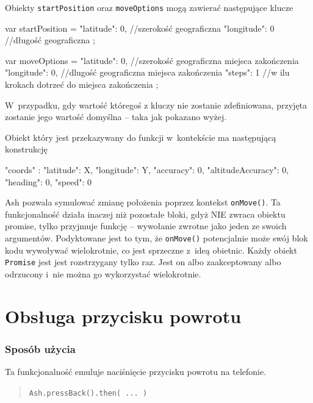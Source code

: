 \documentclass[brudnopis]{xmgr}
\begin{document}
Obiekty \texttt{startPosition} oraz \texttt{moveOptions} mogą zawierać następujące klucze

\begin{javascriptcode}
   var startPosition = {
       "latitude": 0,  //szerokość geograficzna
       "longitude": 0  //długość geograficzna
   };
 
  var moveOptions = {
      "latitude": 0,  //szerokość geograficzna miejsca zakończenia
      "longitude": 0,  //dlugość geograficzna miejsca zakończenia
      "steps": 1  //w ilu krokach dotrzeć do miejsca zakończenia
  };
\end{javascriptcode}

W~przypadku, gdy wartość któregoś z kluczy nie zostanie zdefiniowana, przyjęta zostanie jego wartość domyślna -- taka jak pokazano wyżej. 

Obiekt który jest przekazywany do funkcji w~kontekście ma następującą konstrukcję 

\begin{javascriptcode}

{
  "coords" :  {
      "latitude": X, 
      "longitude": Y,
      "accuracy": 0, 
      "altitudeAccuracy": 0, 
      "heading": 0, 
      "speed": 0
   }
}

\end{javascriptcode}
Ash pozwala symulować zmianę położenia poprzez kontekst \texttt{onMove()}. Ta funkcjonalność działa inaczej niż pozostałe bloki, gdyż NIE zwraca obiektu promise, tylko przyjmuje funkcję -- wywołanie zwrotne jako jeden ze swoich argumentów. Podyktowane jest to tym, że \texttt{onMove()} potencjalnie może swój blok kodu wywoływać wielokrotnie, co jest sprzeczne z~ideą obietnic. Każdy obiekt \texttt{Promise} jest jest rozstrzygany tylko raz. Jest on albo zaakceptowany albo odrzucony i~nie można go wykorzystać wielokrotnie. 

\section{Obsługa przycisku powrotu}

\subsubsection{Sposób użycia}
Ta funkcjonalność emuluje naciśnięcie przycisku powrotu na telefonie. 

\begin{quote}
  \texttt{Ash.pressBack().then( ... )} 
\end{quote}
\end{document}
